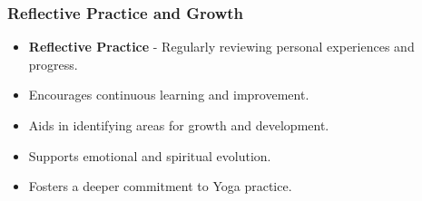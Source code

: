 \begin{frame}[fragile]\frametitle{Reflective Practice and Growth}

      \begin{itemize}
		\item \textbf{Reflective Practice} - Regularly reviewing personal experiences and progress.
		\item Encourages continuous learning and improvement.
		\item Aids in identifying areas for growth and development.
		\item Supports emotional and spiritual evolution.
		\item Fosters a deeper commitment to Yoga practice.
	  \end{itemize}

\end{frame}

